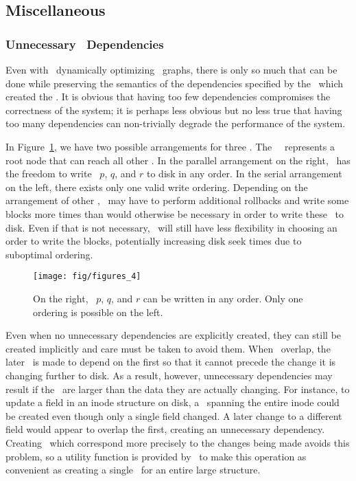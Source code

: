 \subsection{Miscellaneous}
\label{sec:patch:misc}

\subsubsection{Unnecessary \ChDesc\ Dependencies}
Even with \Kudos\ dynamically optimizing \chdesc\ graphs, there is only so much
that can be done while preserving the semantics of the dependencies specified by
the \module\ which created the \chdescs. It is obvious that having too few
dependencies compromises the correctness of the system; it is perhaps less
obvious but no less true that having too many dependencies can non-trivially
degrade the performance of the system.

In Figure~\ref{fig:chdescarrange}, we have two possible arrangements for three
\chdescs. The \noop\ \chdesc\ represents a root node that can reach all
other \chdescs. In the parallel arrangement on the right, \Kudos\ has the
freedom to write \chdescs\ $p$, $q$, and $r$ to disk in any order. In the
serial arrangement on the left, there exists only one valid write ordering.
Depending on the arrangement of other \chdescs, \Kudos\ may have to perform
additional rollbacks and write some blocks more times than would otherwise be
necessary in order to write these \chdescs\ to disk. Even if that is not
necessary, \Kudos\ will still have less flexibility in choosing an order to
write the blocks, potentially increasing disk seek times due to suboptimal
ordering.

\begin{figure}[htb]
  \centering
  \texttt{[image: fig/figures\_4]}
  \caption{\label{fig:chdescarrange} On the right, \chdescs\ $p$, $q$, and $r$
  can be written in any order. Only one ordering is possible on the left.}
\end{figure}

Even when no unnecessary dependencies are explicitly created, they can still be
created implicitly and care must be taken to avoid them. When \chdescs\ overlap,
the later \chdesc\ is made to depend on the first so that it cannot precede the
change it is changing further to disk. As a result, however, unnecessary
dependencies may result if the \chdescs\ are larger than the data they are
actually changing. For instance, to update a field in an inode structure on
disk, a \chdesc\ spanning the entire inode could be created even though only a
single field changed. A later change to a different field would appear to
overlap the first, creating an unnecessary dependency. Creating \chdescs\ which
correspond more precisely to the changes being made avoids this problem, so a
utility function is provided by \Kudos\ to make this operation as convenient as
creating a single \chdesc\ for an entire large structure.

